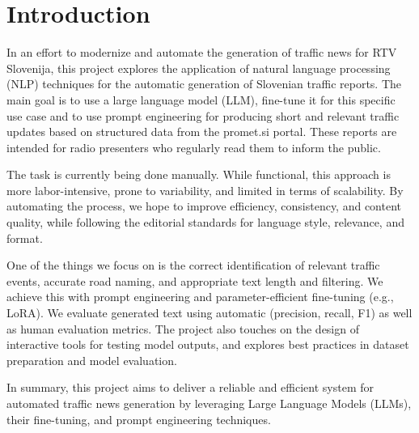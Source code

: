 \documentclass[fleqn,moreauthors,10pt]{ds_report}
\affiliation{\textit{Advisors: Slavko Žitnik}}
\begin{document}
\flushbottom 

\maketitle 

\thispagestyle{empty} 


\section*{Introduction}
In an effort to modernize and automate the generation of traffic news for RTV Slovenija, this project explores the application of natural language processing (NLP) techniques for the automatic generation of Slovenian traffic reports. The main goal is to use a large language model (LLM), fine-tune it for this specific use case and to use prompt engineering for producing short and relevant traffic updates based on structured data from the promet.si portal. These reports are intended for radio presenters who regularly read them to inform the public.\newline

The task is currently being done manually. While functional, this approach is more labor-intensive, prone to variability, and limited in terms of scalability. By automating the process, we hope to improve efficiency, consistency, and content quality, while following the editorial standards for language style, relevance, and format.\newline

One of the things we focus on is the correct identification of relevant traffic events, accurate road naming, and appropriate text length and filtering. We achieve this with prompt engineering and parameter-efficient fine-tuning (e.g., LoRA). We evaluate generated text using automatic (precision, recall, F1) as well as human evaluation metrics. The project also touches on the design of interactive tools for testing model outputs, and explores best practices in dataset preparation and model evaluation.\newline

In summary, this project aims to deliver a reliable and efficient system for automated traffic news generation by leveraging Large Language Models (LLMs), their fine-tuning, and prompt engineering techniques.
\end{document}

